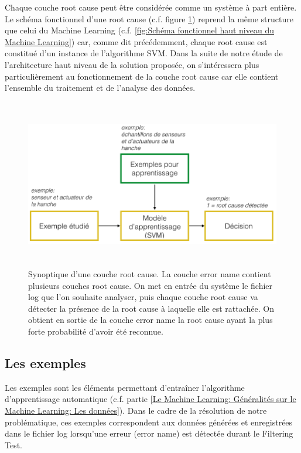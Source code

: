 Chaque couche root cause peut être considérée comme un système à part entière. Le schéma fonctionnel d'une root cause (c.f. figure 	\ref{fig:Synoptique d'une couche root cause}) reprend la même structure que celui du Machine Learning (c.f. \ref{fig:Schéma fonctionnel haut niveau du Machine Learning}) car, comme dit précédemment, chaque root cause est constitué d'un instance de l'algorithme SVM. Dans la suite de notre étude de l'architecture haut niveau de la solution proposée, on s'intéressera plus particulièrement  au fonctionnement de la couche root cause car elle contient l'ensemble du traitement et de l'analyse des données.

\begin{figure}[h]
	\centering\includegraphics[height=7.4cm]{images/exemple_root.png}
	\caption[Synoptique d'une couche root cause]{Synoptique d'une couche root cause. La couche error name contient plusieurs couches root cause. On met en entrée du système le fichier log que l'on souhaite analyser, puis chaque couche root cause va détecter la présence de la root cause à laquelle elle est rattachée. On obtient en sortie de la couche error name la root cause  ayant la plus forte probabilité d'avoir été reconnue.}
	\label{fig:Synoptique d'une couche root cause}
\end{figure}

\subsection{Les exemples}
\label{Automatisation du processus d'investigation: Achitecture High Level du système proposé: Les exemples}
Les exemples sont les éléments permettant d'entraîner l'algorithme d'apprentissage automatique (c.f. partie \ref{Le Machine Learning: Généralités sur le Machine Learning: Les données}). Dans le cadre de la résolution de notre problématique, ces exemples correspondent aux données générées et enregistrées dans le fichier log lorsqu'une erreur (error name) est détectée durant le Filtering Test.

